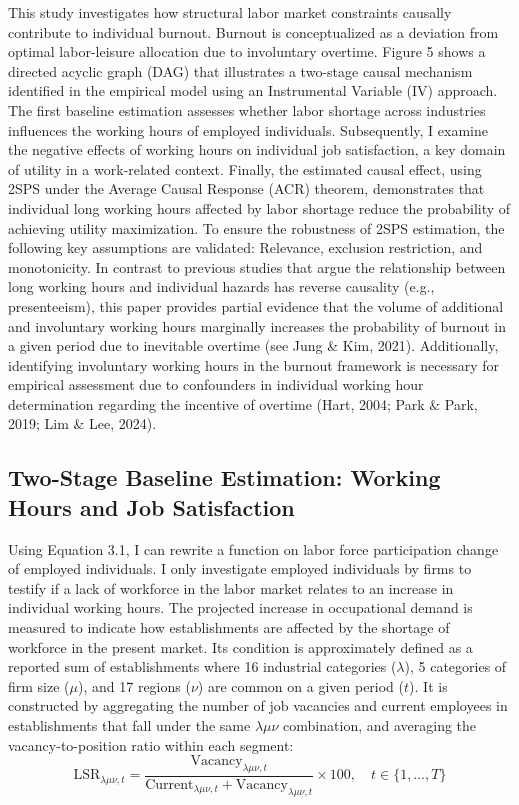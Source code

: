 \documentclass[
  12pt,
]{article}
\begin{document}
This study investigates how structural labor market constraints causally
contribute to individual burnout. Burnout is conceptualized as a
deviation from optimal labor-leisure allocation due to involuntary
overtime. Figure 5 shows a directed acyclic graph (DAG) that illustrates
a two-stage causal mechanism identified in the empirical model using an
Instrumental Variable (IV) approach. The first baseline estimation
assesses whether labor shortage across industries influences the working
hours of employed individuals. Subsequently, I examine the negative
effects of working hours on individual job satisfaction, a key domain of
utility in a work-related context. Finally, the estimated causal effect,
using 2SPS under the Average Causal Response (ACR) theorem, demonstrates
that individual long working hours affected by labor shortage reduce the
probability of achieving utility maximization. To ensure the robustness
of 2SPS estimation, the following key assumptions are validated:
Relevance, exclusion restriction, and monotonicity. In contrast to
previous studies that argue the relationship between long working hours
and individual hazards has reverse causality (e.g., presenteeism), this
paper provides partial evidence that the volume of additional and
involuntary working hours marginally increases the probability of
burnout in a given period due to inevitable overtime (see Jung \& Kim,
2021). Additionally, identifying involuntary working hours in the
burnout framework is necessary for empirical assessment due to
confounders in individual working hour determination regarding the
incentive of overtime (Hart, 2004; Park \& Park, 2019; Lim \& Lee,
2024).

\subsection{Two-Stage Baseline Estimation: Working Hours and Job
Satisfaction}\label{two-stage-baseline-estimation-working-hours-and-job-satisfaction}

Using Equation 3.1, I can rewrite a function on labor force
participation change of employed individuals. I only investigate
employed individuals by firms to testify if a lack of workforce in the
labor market relates to an increase in individual working hours. The
projected increase in occupational demand is measured to indicate how
establishments are affected by the shortage of workforce in the present
market. Its condition is approximately defined as a reported sum of
establishments where 16 industrial categories (\(\lambda\)), 5
categories of firm size (\(\mu\)), and 17 regions (\(\nu\)) are common
on a given period (\(t\)). It is constructed by aggregating the number
of job vacancies and current employees in establishments that fall under
the same \(\lambda\mu\nu\) combination, and averaging the
vacancy-to-position ratio within each segment: \[
\text{LSR}_{\lambda\mu\nu,t} =  \frac{\text{Vacancy}_{\lambda\mu\nu,t}}{\text{Current}_{\lambda\mu\nu,t}+\text{Vacancy}_{\lambda\mu\nu,t}}\times 100, \quad t \in \{1, \dots, T\} 
\]
\end{document}
